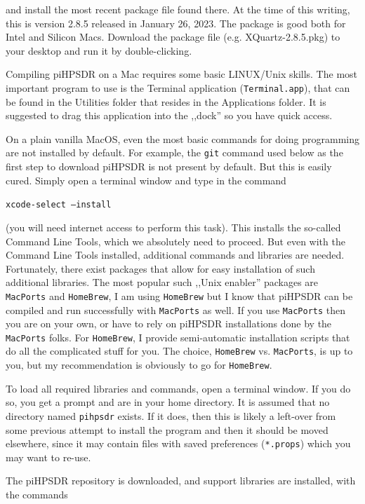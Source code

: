 \documentclass[12pt]{book}
\def\grtt#1{\texttt{\color{magenta}#1}}
\def\pH{pi\-HPSDR\xspace}
\begin{document}
and install the most recent package file found there. At the time of this writing, this is version 2.8.5
released in January 26, 2023. The package is good both for Intel and Silicon Macs. Download the package
file (e.g. XQuartz-2.8.5.pkg) to your desktop and run it by double-clicking.

Compiling \pH on a Mac requires some basic LINUX/Unix skills. The most important program to use is
the Terminal application (\texttt{Terminal.app}), that can be found in the Utilities folder that resides
in the Applications folder. It is suggested to drag this application into the ,,dock'' so you have quick
access.

On a plain vanilla MacOS, even the most basic commands for doing programming are not installed
by default. For example, the \grtt{git} command used below as the first step  to download piHPSDR is
not present by default. But this is easily cured. Simply open a terminal window and type in the command

\grtt{xcode-select --install}

(you will need internet access to perform this task). This installs the so-called Command Line Tools,
which we absolutely need to proceed. But even with the Command Line Tools installed, additional
commands and libraries are needed. Fortunately, there exist packages that allow for easy installation
of such additional libraries.
The most popular such ,,Unix enabler'' packages are \texttt{MacPorts} and \texttt{HomeBrew}, I
am using
\texttt{HomeBrew} but I know that \pH can be compiled and run successfully with \texttt{MacPorts}
as well. If you use \texttt{MacPorts} then you are on your own, or
have to rely on \pH installations done by the \texttt{MacPorts} folks. For \texttt{HomeBrew},
I provide semi-automatic installation scripts that do all the complicated stuff for you. The choice,
\texttt{HomeBrew} vs. \texttt{MacPorts}, is up to you, but my recommendation is obviously
to go for \texttt{HomeBrew}.

To load all required libraries and commands, open a terminal window. If you do so, you get
a prompt and are in your home directory. It is assumed that no directory named \texttt{pihpsdr}
exists. If it does, then this is likely a left-over from some previous
attempt to install the program and then it should be moved elsewhere, since it may contain
files with saved preferences (\texttt{*.props}) which you may want to re-use.

The \pH repository is downloaded, and support libraries are installed, with the commands
\end{document}
